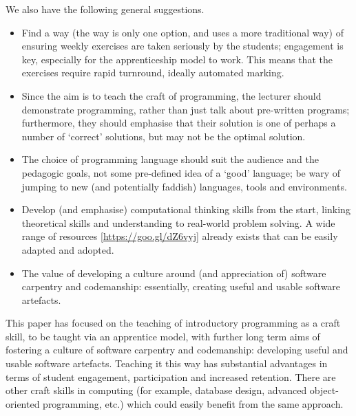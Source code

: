 \documentclass[conference,compsoc]{IEEEtran}
\begin{document}
We also have the following general suggestions.
\begin{itemize}
	\item	Find a way (the \BathM{} way is only one option, and \BathC{} uses a more traditional way) of ensuring weekly exercises are taken seriously by the students; engagement is key, especially for the apprenticeship model to work. This means that the exercises require rapid turnround, ideally automated marking.
	\item	Since the aim is to teach the craft of programming, the lecturer should demonstrate programming, rather than just talk about pre-written programs; furthermore, they should emphasise that their solution is one of perhaps a number of `correct' solutions, but may not be the optimal solution.
	\item	The choice of programming language should suit the audience and the pedagogic goals, not some pre-defined idea of a `good' language; be wary of jumping to new (and potentially faddish) languages, tools and environments.
	\item	Develop (and emphasise) computational thinking skills from the start, linking theoretical skills and understanding to real-world problem solving. A wide range of resources [\url{https://goo.gl/dZ6vyj}] already exists that can be easily adapted and adopted.
	\item	The value of developing a culture around (and appreciation of) software carpentry and codemanship: essentially, creating useful and usable software artefacts.
\end{itemize} 

This paper has focused on the teaching of introductory programming as
a craft skill, to be taught via an apprentice model, with further long
term aims of fostering a culture of software carpentry and
codemanship: developing useful and usable software artefacts. Teaching
it this way has substantial advantages in terms of student engagement,
participation and increased retention. There are other craft skills in
computing (for example, database design, advanced object-oriented
programming, etc.) which could easily benefit from the same approach.
\end{document}
